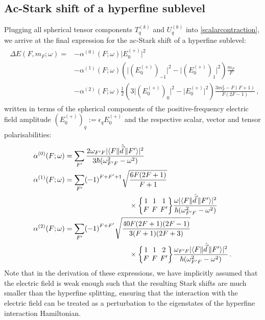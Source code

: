 \documentclass[../Thesis-IJspeert.tex]{subfiles}
\begin{document}
\subsection{Ac-Stark shift of a hyperfine sublevel}
Plugging all spherical tensor components $T^{(k)}_q$ and $U^{(k)}_q$ into \autoref{scalarcontraction}, we arrive at the final expression for the ac-Stark shift of a hyperfine sublevel:
\begin{align}
\label{acStarkHyperfineShifts}
\begin{split}
	\Delta E\left(F,m_F;\omega\right) = &- \alpha^{(0)}\left(F;\omega\right) \lvert E_0^{(+)}\rvert ^2 \\&- \alpha^{(1)} \left(F;\omega\right)   \left( \lvert (E_0^{(+)})_{-1}\rvert ^2 - \lvert (E_0^{(+)})_{1}\rvert ^2  \right)    \frac{m_F}{F}   \\&- \alpha^{(2)}\left(F;\omega\right)\frac{1}{2}\left(3\lvert (E_{0}^{(+)})_0 \rvert ^2 - \lvert E_0^{(+)}\rvert ^2 \right) \frac{3m_F^2-F\left(F+1\right)}{F\left(2F-1\right)} \,,
\end{split}
\end{align}
written in terms of the spherical components of the positive-frequency electric field amplitude $(E_0^{(+)})_q:={\epsilon}_q E_0^{(+)}$ and the respective scalar, vector and tensor polarisabilities:
\begin{align}
\label{Ftensorpolarisabilities}
\begin{split}
 \alpha^{(0)}\left(F;\omega\right) &= \sum_{F'} \frac{2\omega_{F'F} \lvert \langle{F}\| \hat{\vec{d}}\, \|{F'}\rangle\rvert^2}{3\hbar\left(\omega_{F'F}^2-\omega^2\right)} \\ \alpha^{(1)}\left(F;\omega\right) &= \sum_{F'}  \left(-1\right)^{F+F'+1}\sqrt{\frac{6F\left(2F+1\right)}{F+1}}  \\ &\hspace{9em}\times\tj{1}{1}{1}{F}{F}{F'} \frac{\omega \lvert \langle{F}\|  \hat{\vec{d}}\,  \|{F'}\rangle\rvert^2}{\hbar\left(\omega_{F'F}^2-\omega^2\right)} \\ \alpha^{(2)}\left(F;\omega\right) &= \sum_{F'}  \left(-1\right)^{F+F'}\sqrt{\frac{40F\left(2F+1\right)\left(2F-1\right)}{3\left(F+1\right)\left(2F+3\right)}} \\ &\hspace{9em}\times \tj{1}{1}{2}{F}{F}{F'}  \frac{\omega_{F'F} \lvert \langle{F}\|  \hat{\vec{d}}\,  \|{F'}\rangle\rvert^2}{\hbar\left(\omega_{F'F}^2-\omega^2\right)}  \,.
\end{split}    
\end{align}
Note that in the derivation of these expressions, we have implicitly assumed that the electric field is weak enough such that the resulting Stark shifts are much smaller than the hyperfine splitting, ensuring that the interaction with the electric field can be treated as a perturbation to the eigenstates of the hyperfine interaction Hamiltonian.
\end{document}
